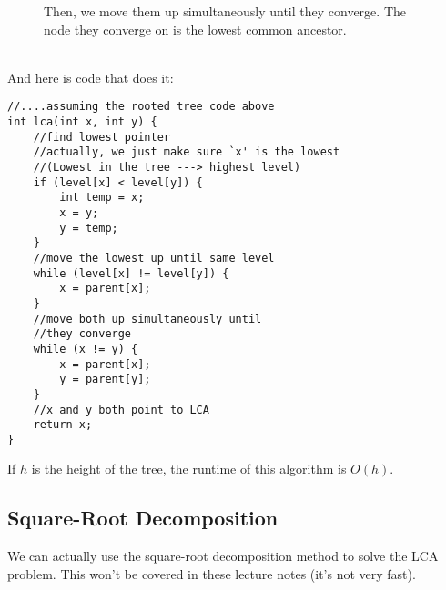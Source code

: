 \documentclass[11pt]{article}
\theoremstyle{plain}
\theoremstyle{definition}
\begin{document}
\begin{figure}[!ht]
\caption{Then, we move them up simultaneously until they converge. The node they converge on is the lowest common ancestor.}
\centering
{}
\end{figure}
\\
\noindent
And here is code that does it:
\begin{lstlisting}
//....assuming the rooted tree code above
int lca(int x, int y) {
	//find lowest pointer
	//actually, we just make sure `x' is the lowest
	//(Lowest in the tree ---> highest level)
	if (level[x] < level[y]) {
		int temp = x;
		x = y;
		y = temp;
	}
	//move the lowest up until same level
	while (level[x] != level[y]) {
		x = parent[x];
	}
	//move both up simultaneously until
	//they converge
	while (x != y) {
		x = parent[x];
		y = parent[y];
	}
	//x and y both point to LCA
	return x;
}
\end{lstlisting}
If $h$ is the height of the tree, the runtime of this algorithm is $\boxed{O(h)}$.
\subsection{Square-Root Decomposition}
We can actually use the square-root decomposition method to solve the LCA problem. This won't be covered in these lecture notes (it's not very fast).
\end{document}
